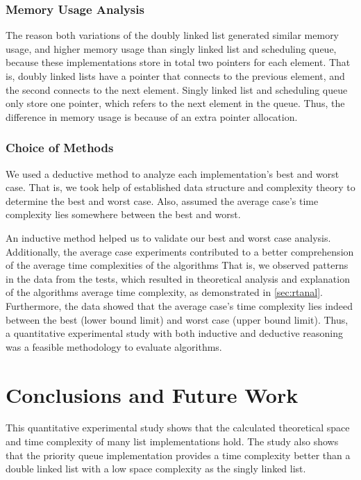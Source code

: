 \documentclass[a4paper,11pt]{kth-mag}
\newcommand*{\skippara}{\par\vspace{\baselineskip} \noindent}
\begin{document}
\subsection{Memory Usage Analysis}
The reason both variations of the doubly linked list generated similar memory usage, and higher memory usage than singly linked list and scheduling queue, because these implementations store in total two pointers for each element.
That is, doubly linked lists have a pointer that connects to the previous element, and the second connects to the next element.
Singly linked list and scheduling queue only store one pointer, which refers to the next element in the queue.
Thus, the difference in memory usage is because of an extra pointer allocation.

\subsection{Choice of Methods}
We used a deductive method to analyze each implementation's best and worst case.
That is, we took help of established data structure and complexity theory to determine the best and worst case.
Also, assumed the average case's time complexity lies somewhere between the best and worst.

\skippara An inductive method helped us to validate our best and worst case analysis.
Additionally, the average case experiments contributed to a better comprehension of the average time complexities of the algorithms
That is, we observed patterns in the data from the tests, which resulted in theoretical analysis and explanation of the algorithms average time complexity, as demonstrated in \cref{sec:rtanal}.
Furthermore, the data showed that the average case's time complexity lies indeed between the best (lower bound limit) and worst case (upper bound limit).
Thus, a quantitative experimental study with both inductive and deductive reasoning was a feasible methodology to evaluate algorithms.


\chapter{Conclusions and Future Work}\label{chapter:conclusion}
This quantitative experimental study shows that the calculated theoretical space and time complexity of many list implementations hold.
The study also shows that the priority queue implementation provides a time complexity better than a double linked list with a low space complexity as the singly linked list.
\end{document}

